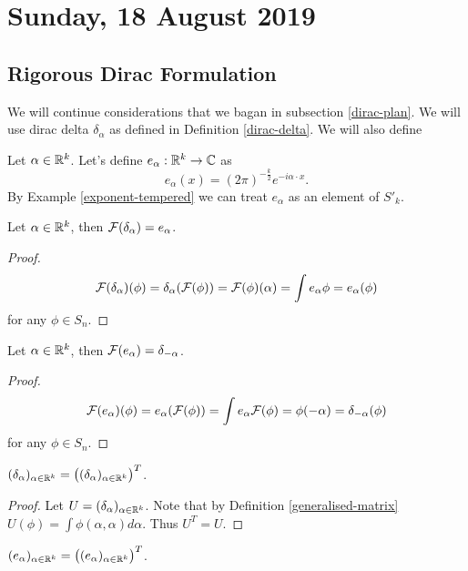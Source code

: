 \documentclass[main.tex]{subfiles}
\begin{document}
\section{Sunday, 18 August 2019}
\subsection{Rigorous Dirac Formulation}
We will continue considerations that we bagan in subsection \ref{dirac-plan}. We will use dirac delta $\delta_\alpha$ as defined in Definition \ref{dirac-delta}.
We will also define
\begin{definition}
Let $\alpha\in\mathbb{R}^k$. Let's define $e_\alpha:\mathbb{R}^k\to \mathbb{C}$ as
\begin{equation}
e_\alpha(x) = (2\pi)^{-\frac{k}{2}} e^{-i\alpha \cdot x}.
\end{equation}
By Example \ref{exponent-tempered} we can treat $e_\alpha$ as an element of $S'_k$.
\begin{fact} Let $\alpha\in\mathbb{R}^k$, then
$\mathcal{F}(\delta_\alpha) = e_\alpha$.
\end{fact}
\begin{proof}
\begin{equation}
\mathcal{F}(\delta_\alpha)(\phi) = \delta_\alpha(\mathcal{F}(\phi)) = \mathcal{F}(\phi)(\alpha) = \int e_\alpha \phi = e_\alpha(\phi)
\end{equation}
for any $\phi \in S_n$.
\end{proof}
\begin{fact}
Let $\alpha\in\mathbb{R}^k$, then $\mathcal{F}(e_\alpha) = \delta_{-\alpha}$.
\end{fact}
\begin{proof}
\begin{equation}
\mathcal{F}(e_\alpha)(\phi) = e_\alpha(\mathcal{F}(\phi)) = \int e_\alpha \mathcal{F}(\phi) = \phi(-\alpha) = \delta_{-\alpha}(\phi)
\end{equation}
for any $\phi \in S_n$.
\end{proof}
\begin{proposition}
$(\delta_\alpha)_{\alpha\in\mathbb{R}^k} = \big((\delta_\alpha)_{\alpha\in\mathbb{R}^k} \big)^T$.
\end{proposition}
\end{definition}
\begin{proof}
Let $U = (\delta_\alpha)_{\alpha\in\mathbb{R}^k}$. Note that by Definition \ref{generalised-matrix} $U(\phi) = \int \phi(\alpha,\alpha) d\alpha$. Thus $U^T = U$.  
\end{proof}
\begin{proposition}
$(e_\alpha)_{\alpha\in\mathbb{R}^k} = \big((e_\alpha)_{\alpha\in\mathbb{R}^k} \big)^T$.
\end{proposition}
\end{document}
